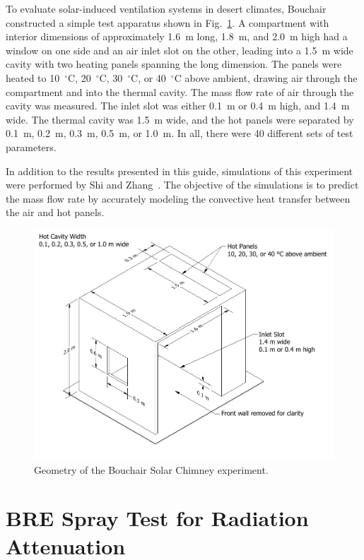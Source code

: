 To evaluate solar-induced ventilation systems in desert climates, Bouchair~\cite{Bouchair:Thesis} constructed a simple test apparatus shown in Fig.~\ref{Bouchair_Drawing}. A compartment with interior dimensions of approximately 1.6~m long, 1.8~m, and 2.0~m high had a window on one side and an air inlet slot on the other, leading into a 1.5~m wide cavity with two heating panels spanning the long dimension. The panels were heated to 10~$^\circ$C, 20~$^\circ$C, 30~$^\circ$C, or 40~$^\circ$C above ambient, drawing air through the compartment and into the thermal cavity. The mass flow rate of air through the cavity was measured. The inlet slot was either 0.1~m or 0.4~m high, and 1.4~m wide. The thermal cavity was 1.5~m wide, and the hot panels were separated by 0.1~m, 0.2~m, 0.3~m, 0.5~m, or 1.0~m. In all, there were 40 different sets of test parameters.

In addition to the results presented in this guide, simulations of this experiment were performed by Shi and Zhang~\cite{Shi:BE2016}. The objective of the simulations is to predict the mass flow rate by accurately modeling the convective heat transfer between the air and hot panels.

\begin{figure}[!ht]
\includegraphics[width=\textwidth]{FIGURES/Bouchair_Solar_Chimney/Bouchair_Solar_Chimney}
\caption[Geometry of the Bouchair Solar Chimney experiment]{Geometry of the Bouchair Solar Chimney experiment.}
\label{Bouchair_Drawing}
\end{figure}


\section{BRE Spray Test for Radiation Attenuation}
\label{BRE_Spray_Description}

